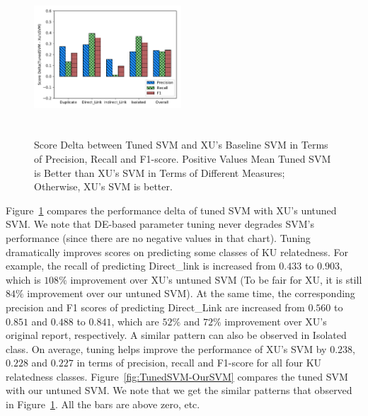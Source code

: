 \documentclass[sigconf,review, anonymous]{acmart}
\theoremstyle{break}
\newcommand{\fig}[1]{Figure~\ref{fig:#1}}
\begin{document}
 \begin{figure}[!t]
    \centering
     \includegraphics[width=0.49\textwidth,height=2.3in]{pic/TunedSVM-SVM.pdf} %
    \caption{Score Delta between Tuned SVM and XU's Baseline SVM in Terms of Precision, Recall and F1-score. Positive Values Mean
            Tuned SVM is Better than XU's SVM in Terms of Different Measures; Otherwise, XU's SVM is better.}
    \label{fig:TunedSVM-SVM}
\end{figure}

 
\fig{TunedSVM-SVM} compares the performance delta of tuned SVM with XU's untuned SVM.
 We note that DE-based parameter tuning never degrades SVM's performance
 (since there are no negative values in that chart). 
 Tuning dramatically improves scores on predicting some classes of KU relatedness. 
 For example, the {recall} of predicting {Direct\_link} is increased 
 from $0.433$ to $0.903$, which is $108\%$ improvement over XU's untuned SVM
 (To be fair for XU, it is still $84\%$ improvement over our untuned SVM).
 At the same time, the corresponding {precision} and {F1} scores of predicting {Direct\_Link} 
 are increased from $0.560$ to $0.851$ and $0.488$ to $0.841$, 
which are $52\%$ and $72\%$ improvement over XU's original report\cite{xu2016predicting}, respectively. 
 A similar pattern can also be observed in {Isolated} class. On average, tuning helps improve the performance
of XU's SVM by $0.238$, $0.228$ and $0.227$ in terms of {precision}, {recall} and {F1-score}
for all four KU relatedness classes. \fig{TunedSVM-OurSVM} compares the tuned SVM with our untuned SVM. We note that we get 
the similar patterns that observed in \fig{TunedSVM-SVM}. All the bars are above zero, etc.

\end{document}
